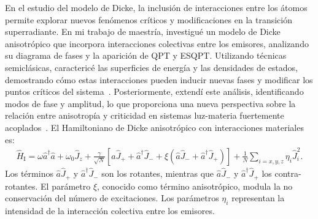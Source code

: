 \documentclass[onecolumn,notitlepage,letterpaper,aps,pra,12pt]{article}
\numberwithin{equation}{section}
\begin{document}
En el estudio del modelo de Dicke, la inclusión de interacciones entre los átomos permite explorar nuevos fenómenos críticos y modificaciones en la transición superradiante. En mi trabajo de maestría, investigué un modelo de Dicke anisotrópico que incorpora interacciones colectivas entre los emisores, analizando su diagrama de fases y la aparición de QPT y ESQPT. Utilizando técnicas semiclásicas, caractericé las superficies de energía y las densidades de estados, demostrando cómo estas interacciones pueden inducir nuevas fases y modificar los puntos críticos del sistema~\cite{Herrera2022}. Posteriormente, extendí este análisis, identificando modos de fase y amplitud, lo que proporciona una nueva perspectiva sobre la relación entre anisotropía y criticidad en sistemas luz-materia fuertemente acoplados~\cite{herrera2024}. El Hamiltoniano de Dicke anisotrópico con interacciones materiales es:
\begin{gather}
    \hat{H}_{\text{I}} = \omega\hat{a}^{\dagger}\hat{a} + \omega_{0}\hat{J}_{z} + \frac{\gamma}{\sqrt{N}}\left[ \hat{a}\hat{J}_{+} + \hat{a}^{\dagger}\hat{J}_{-} + \xi\left( \hat{a}\hat{J}_{-} + \hat{a}^{\dagger}\hat{J}_{+} \right)  \right] + \frac{1}{N}\sum_{i=x,y,z} \eta_{i}\hat{J}_{i}^{2}.
\end{gather}
Los términos $\hat{a}\hat{J}_{+}$ y $\hat{a}^{\dagger}\hat{J}_{-}$ son los rotantes, mientras que $\hat{a}\hat{J}_{-}$ y $\hat{a}^{\dagger}\hat{J}_{+}$ los contra-rotantes. El parámetro $\xi$, conocido como término anisotrópico, modula la no conservación del número de excitaciones. Los parámetros $\eta_{i}$ representan la intensidad de la interacción colectiva entre los emisores.
\end{document}
